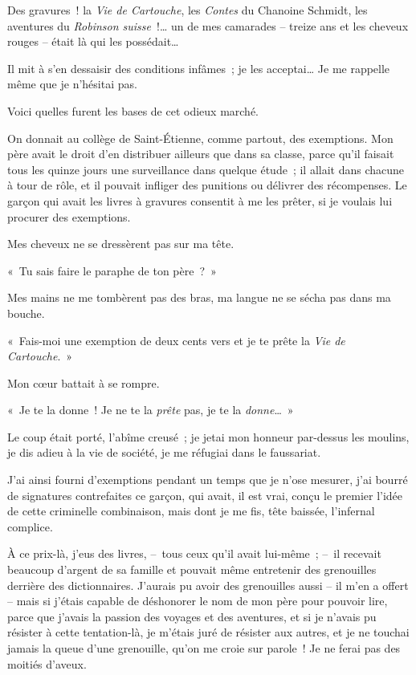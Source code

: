 \documentclass[french,twoside]{book} %
\begin{document}
Des gravures ! la \emph{Vie de Cartouche}, les \emph{Contes} du Chanoine Schmidt, les aventures du \emph{Robinson suisse} !… un de mes camarades – treize ans et les cheveux rouges – était là qui les possédait…\par
Il mit à s’en dessaisir des conditions infâmes ; je les acceptai… Je me rappelle même que je n’hésitai pas.\par
Voici quelles furent les bases de cet odieux marché.\par
On donnait au collège de Saint-Étienne, comme partout, des exemptions. Mon père avait le droit d’en distribuer ailleurs que dans sa classe, parce qu’il faisait tous les quinze jours une surveillance dans quelque étude ; il allait dans chacune à tour de rôle, et il pouvait infliger des punitions ou délivrer des récompenses. Le garçon qui avait les livres à gravures consentit à me les prêter, si je voulais lui procurer des exemptions.\par
Mes cheveux ne se dressèrent pas sur ma tête.\par
« Tu sais faire le paraphe de ton père ? »\par
Mes mains ne me tombèrent pas des bras, ma langue ne se sécha pas dans ma bouche.\par
« Fais-moi une exemption de deux cents vers et je te prête la \emph{Vie de Cartouche}. »\par
Mon cœur battait à se rompre.\par
« Je te la donne ! Je ne te la \emph{prête} pas, je te la \emph{donne}… »\par
Le coup était porté, l’abîme creusé ; je jetai mon honneur par-dessus les moulins, je dis adieu à la vie de société, je me réfugiai dans le faussariat.\par
\bigbreak
\noindent J’ai ainsi fourni d’exemptions pendant un temps que je n’ose mesurer, j’ai bourré de signatures contrefaites ce garçon, qui avait, il est vrai, conçu le premier l’idée de cette criminelle combinaison, mais dont je me fis, tête baissée, l’infernal complice.\par
À ce prix-là, j’eus des livres, – tous ceux qu’il avait lui-même ; – il recevait beaucoup d’argent de sa famille et pouvait même entretenir des grenouilles derrière des dictionnaires. J’aurais pu avoir des grenouilles aussi – il m’en a offert – mais si j’étais capable de déshonorer le nom de mon père pour pouvoir lire, parce que j’avais la passion des voyages et des aventures, et si je n’avais pu résister à cette tentation-là, je m’étais juré de résister aux autres, et je ne touchai jamais la queue d’une grenouille, qu’on me croie sur parole ! Je ne ferai pas des moitiés d’aveux.\par
\end{document}
